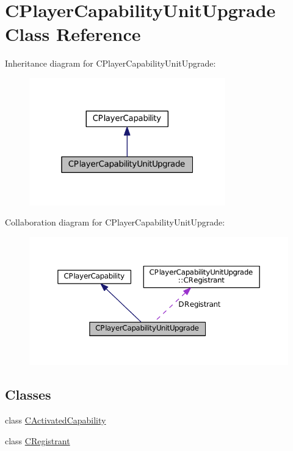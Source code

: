 \hypertarget{classCPlayerCapabilityUnitUpgrade}{}\section{C\+Player\+Capability\+Unit\+Upgrade Class Reference}
\label{classCPlayerCapabilityUnitUpgrade}


Inheritance diagram for C\+Player\+Capability\+Unit\+Upgrade\+:\nopagebreak
\begin{figure}[H]
\begin{center}
\leavevmode
\includegraphics[width=241pt]{classCPlayerCapabilityUnitUpgrade__inherit__graph}
\end{center}
\end{figure}


Collaboration diagram for C\+Player\+Capability\+Unit\+Upgrade\+:\nopagebreak
\begin{figure}[H]
\begin{center}
\leavevmode
\includegraphics[width=350pt]{classCPlayerCapabilityUnitUpgrade__coll__graph}
\end{center}
\end{figure}
\subsection*{Classes}
\begin{DoxyCompactItemize}
\item 
class \hyperlink{classCPlayerCapabilityUnitUpgrade_1_1CActivatedCapability}{C\+Activated\+Capability}
\item 
class \hyperlink{classCPlayerCapabilityUnitUpgrade_1_1CRegistrant}{C\+Registrant}
\end{DoxyCompactItemize}
